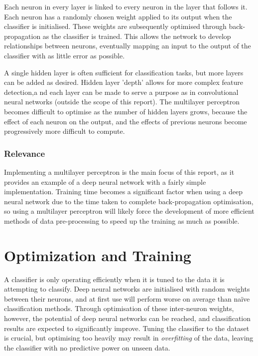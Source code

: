 Each neuron in every layer is linked to every neuron in the layer that follows it. Each neuron has a randomly chosen weight applied to its output when the classifier is initialised. These weights are subsequently optimised through back-propagation as the classifier is trained. This allows the network to develop relationships between neurons, eventually mapping an input to the output of the classifier with as little error as possible.

A single hidden layer is often sufficient for classification tasks, but more layers can be added as desired. Hidden layer 'depth' allows for more complex feature detection,a nd each layer can be made to serve a purpose as in convolutional neural networks (outside the scope of this report). The multilayer perceptron becomes difficult to optimise as the number of hidden layers grows, because the effect of each neuron on the output, and the effects of previous neurons become progressively more difficult to compute.

\subsubsection{Relevance}
Implementing a multilayer perceptron is the main focus of this report, as it provides an example of a deep neural network with a fairly simple implementation. Training time becomes a significant factor when using a deep neural network due to the time taken to complete back-propagation optimisation, so using a multilayer perceptron will likely force the development of more efficient methods of data pre-processing to speed up the training as much as possible.

\section{Optimization and Training}
A classifier is only operating efficiently when it is tuned to the data it is attempting to classify. Deep neural networks are initialised with random weights between their neurons, and at first use will perform worse on average than na{\"ive} classification methods. Through optimisation of these inter-neuron weights, however, the potential of deep neural networks can be reached, and classification results are expected to significantly improve. Tuning the classifier to the dataset is crucial, but optimising too heavily may result in \textit{overfitting} of the data, leaving the classifier with no predictive power on unseen data.

